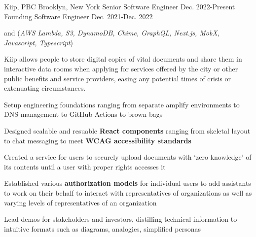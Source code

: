 

\begin{cventries}


  \nrolecventrynoitems
    {Kiip, PBC} %
    {Brooklyn, New York} %
    {Senior Software Engineer} %
    {Dec. 2022-Present} %
    {Founding Software Engineer} %
    {Dec. 2021-Dec. 2022} %
    {} %
    {} %

  \cvcustombodydescription
    { and  (\emph{AWS Lambda, S3, DynamoDB, Chime, GraphQL, Next.js, MobX, Javascript, Typescript})}
    {
      \begin{cvtightprose} %
        {Kiip allows people to store digital copies of vital documents and share them in interactive data rooms when applying for services offered by the city or other public benefits and service providers, easing any potential times of crisis or extenuating circumstances.}
      \end{cvtightprose}
    }
    {
      \begin{cvitems} %
        \item {Setup engineering foundations ranging from separate amplify environments to DNS management to GitHub Actions to brown bags}
        \item {Designed scalable and resuable \textbf{React components} ranging from skeletal layout to chat messaging to meet \textbf{WCAG accessibility standards}}
        \item {Created a service for users to securely upload documents with `zero knowledge' of its contents until a user with proper rights accesses it}
        \item {Established various \textbf{authorization models} for individual users to add assistants to work on their behalf to interact with representatives of organizations as well as varying levels of representatives of an organization}
        \item {Lead demos for stakeholders and investors, distilling technical information to intuitive formats such as diagrams, analogies, simplified personas}
      \end{cvitems}
    }


\end{cventries}
